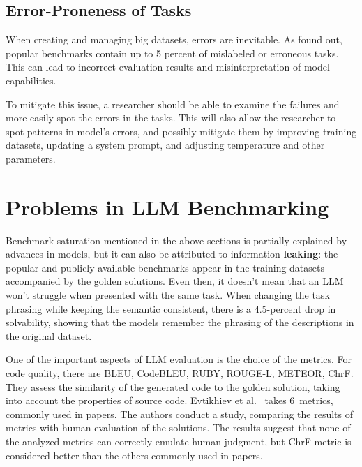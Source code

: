\subsection{Error-Proneness of Tasks}

When creating and managing big datasets, errors are inevitable.
As\cite{vendrow2025largelanguagemodelbenchmarks} found out, popular benchmarks contain up to 5 percent of mislabeled or erroneous tasks.
This can lead to incorrect evaluation results and misinterpretation of model capabilities.

To mitigate this issue, a researcher should be able to examine the failures and more easily spot the errors in the tasks.
This will also allow the researcher to spot patterns in model's errors, and possibly mitigate them by improving training datasets, updating a system prompt, and adjusting temperature and other parameters.

\section{Problems in LLM Benchmarking}


Benchmark saturation mentioned in the above sections is partially explained by advances in models, but it can also be attributed to information \textbf{leaking}: the popular and publicly available benchmarks appear in the training datasets accompanied by the golden solutions.
Even then, it doesn't mean that an LLM won't struggle when presented with the same task.
When changing the task phrasing while keeping the semantic consistent, there is a 4.5-percent drop in solvability, showing that the models remember the phrasing of the descriptions in the original dataset. \cite{uniyal2024one}

One of the important aspects of LLM evaluation is the choice of the metrics.
For code quality, there are BLEU, CodeBLEU, RUBY, ROUGE-L, METEOR, ChrF\@.
They assess the similarity of the generated code to the golden solution, taking into account the properties of source code.
Evtikhiev et al.~\cite{evtikhiev2023out} takes 6~metrics, commonly used in papers.
The authors conduct a study, comparing the results of metrics with human evaluation of the solutions.
The results suggest that none of the analyzed metrics can correctly emulate human judgment, but ChrF metric is considered better than the others commonly used in papers.

